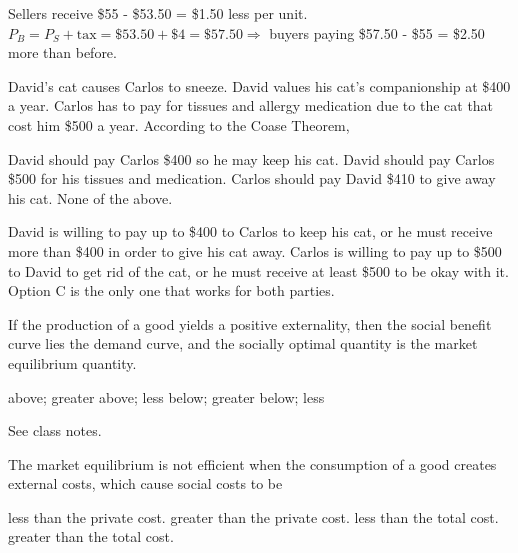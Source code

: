 \documentclass[addpoints,11pt]{exam}
\theoremstyle{definition}
\newcommand{\blank}[0]{\underline{\hspace{3cm}}}
\begin{document}
\begin{questions}
		\begin{solution}
			Sellers receive \$55 - \$53.50 = \$1.50 less per unit. $P_B = P_S + \text{tax} = \$53.50 + \$4 = \$57.50 \Rightarrow$ buyers paying \$57.50 - \$55 = \$2.50 more than before.
		\end{solution}

	
	\question David's cat causes Carlos to sneeze. David values his cat's companionship at \$400 a year. Carlos has to pay for tissues and allergy medication due to the cat that cost him \$500 a year. According to the Coase Theorem,
	
	\begin{choices}
		\choice David should pay Carlos \$400 so he may keep his cat.
		\choice David should pay Carlos \$500 for his tissues and medication.
		\CorrectChoice Carlos should pay David \$410 to give away his cat.
		\choice None of the above.
	\end{choices}
	
	\begin{solution}
		David is willing to pay up to \$400 to Carlos to keep his cat, or he must receive more than \$400 in order to give his cat away. Carlos is willing to pay up to \$500 to David to get rid of the cat, or he must receive at least \$500 to be okay with it. Option C is the only one that works for both parties.
	\end{solution}
	
	
	\question If the production of a good yields a positive externality, then the social benefit curve lies \blank the demand curve, and the socially optimal quantity is \blank the market equilibrium quantity.
	
	\begin{choices}
		\CorrectChoice above; greater
		\choice above; less
		\choice below; greater
		\choice below; less
	\end{choices}
	
	\begin{solution}
		See class notes.
	\end{solution}
	
	\question The market equilibrium is not efficient when the consumption of a good creates external costs, which cause social costs to be 
	
	\begin{choices}
		\choice less than the private cost.
		\CorrectChoice greater than the private cost.
		\choice less than the total cost.
		\choice greater than the total cost.
	\end{choices}
	

\end{questions}
\end{document}
